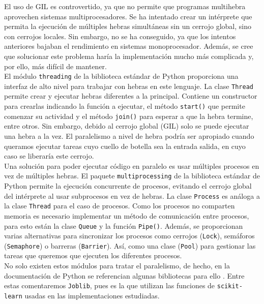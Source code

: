 \documentclass[12pt,a4paper]{report} %
\theoremstyle{definition}
\begin{document}
El uso de GIL es controvertido, ya que no permite que programas multihebra aprovechen sistemas multiprocesadores. Se ha intentado crear un intérprete que permita la ejecución de múltiples hebras simultáneas sin un cerrojo global, sino con cerrojos locales. Sin embargo, no se ha conseguido, ya que los intentos anteriores bajaban el rendimiento en sistemas monoprocesador. Además, se cree que solucionar este problema haría la implementación mucho más complicada y, por ello, más difícil de mantener.\\

% 
El módulo \texttt{threading} \cite{threading} de la biblioteca estándar de Python proporciona una interfaz de alto nivel para trabajar con hebras en este lenguaje. La clase \texttt{Thread} permite crear y ejecutar hebras diferentes a la principal. Contiene un constructor para crearlas indicando la función a ejecutar, el método \texttt{start()} que permite comenzar su actividad y el método \texttt{join()} para esperar a que la hebra termine, entre otros. Sin embargo, debido al cerrojo global (GIL) solo se puede ejecutar una hebra a la vez. El paralelismo a nivel de hebra podría ser apropiado cuando queramos ejecutar tareas cuyo cuello de botella sea la entrada salida, en cuyo caso se liberaría este cerrojo. \\


Una solución para poder ejecutar código en paralelo es usar múltiples procesos en vez de múltiples hebras. El paquete \texttt{multiprocessing} \cite{multiprocessing} de la biblioteca estándar de Python permite la ejecución concurrente de procesos, evitando el cerrojo global del intérprete al usar subprocesos en vez de hebras. La clase \texttt{Process} es análoga a la clase \texttt{Thread} para el caso de procesos. Como los procesos no comparten memoria es necesario implementar un método de comunicación entre procesos, para esto están la clase \texttt{Queue} y la función \texttt{Pipe()}. Además, se proporcionan varias alternativas para sincronizar los procesos como cerrojos (\texttt{Lock}), semáforos (\texttt{Semaphore}) o barreras (\texttt{Barrier}). Así, como una clase (\texttt{Pool}) para gestionar las tareas que queremos que ejecuten los diferentes procesos.\\

No solo existen estos módulos para tratar el paralelismo, de hecho, en la documentación de Python se referencian algunas bibliotecas para ello \cite{parallelprocessing}. Entre estas comentaremos \texttt{Joblib}, pues es la que utilizan las funciones de \texttt{scikit-learn} usadas en las implementaciones estudiadas.\\
\end{document}
